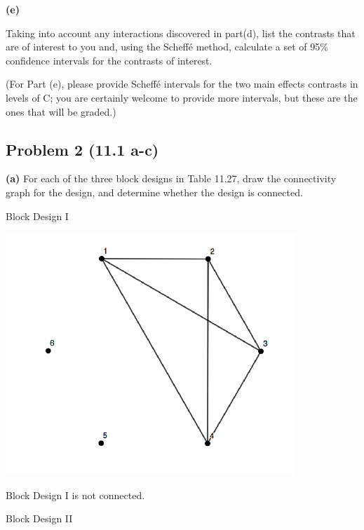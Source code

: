 \documentclass[12pt,]{article}
\begin{document}
\textbf{(e)}

Taking into account any interactions discovered in part(d), list the
contrasts that are of interest to you and, using the Scheffé method,
calculate a set of 95\% confidence intervals for the contrasts of
interest.

(For Part (e), please provide Scheffé intervals for the two main effects
contrasts in levels of C; you are certainly welcome to provide more
intervals, but these are the ones that will be graded.)

\subsection{Problem 2 (11.1 a-c)}\label{problem-2-11.1-a-c}

\textbf{(a)} For each of the three block designs in Table 11.27, draw
the connectivity graph for the design, and determine whether the design
is connected.

\begin{center}
Block Design I
\end{center}

\begin{center}\includegraphics{Markdown_HW_8_files/figure-latex/unnamed-chunk-7-1} \end{center}

Block Design I is not connected.

\begin{center}
Block Design II
\end{center}
\end{document}

